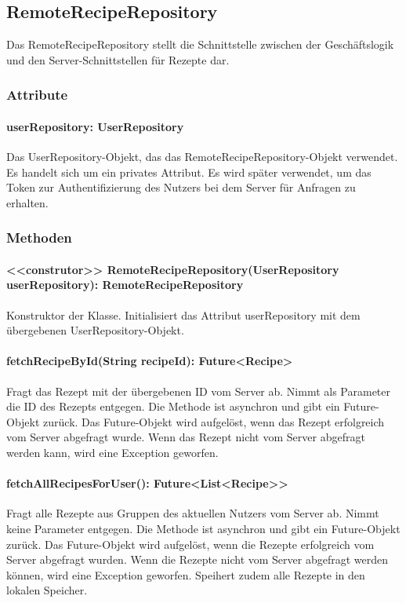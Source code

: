 \documentclass[parskip=full]{scrartcl}
\begin{document}
\subsection{RemoteRecipeRepository}
Das RemoteRecipeRepository stellt die Schnittstelle zwischen der Geschäftslogik und den Server-Schnittstellen für Rezepte dar.
\subsubsection{Attribute}
\paragraph{userRepository: UserRepository}
Das UserRepository-Objekt, das das RemoteRecipeRepository-Objekt verwendet. Es handelt sich um ein privates Attribut. Es wird später verwendet, um das Token zur Authentifizierung des Nutzers bei dem Server für Anfragen zu erhalten.
\subsubsection{Methoden}
\paragraph{<<construtor>> RemoteRecipeRepository(UserRepository userRepository): RemoteRecipeRepository}
Konstruktor der Klasse. Initialisiert das Attribut userRepository mit dem übergebenen UserRepository-Objekt.
\paragraph{fetchRecipeById(String recipeId): Future<Recipe>}
Fragt das Rezept mit der übergebenen ID vom Server ab. Nimmt als Parameter die ID des Rezepts entgegen. Die Methode ist asynchron und gibt ein Future-Objekt zurück. Das Future-Objekt wird aufgelöst, wenn das Rezept erfolgreich vom Server abgefragt wurde. Wenn das Rezept nicht vom Server abgefragt werden kann, wird eine Exception geworfen.
\paragraph{fetchAllRecipesForUser(): Future<List<Recipe>>}
Fragt alle Rezepte aus Gruppen des aktuellen Nutzers vom Server ab. Nimmt keine Parameter entgegen. Die Methode ist asynchron und gibt ein Future-Objekt zurück. Das Future-Objekt wird aufgelöst, wenn die Rezepte erfolgreich vom Server abgefragt wurden. Wenn die Rezepte nicht vom Server abgefragt werden können, wird eine Exception geworfen. Speihert zudem alle Rezepte in den lokalen Speicher.
\end{document}
